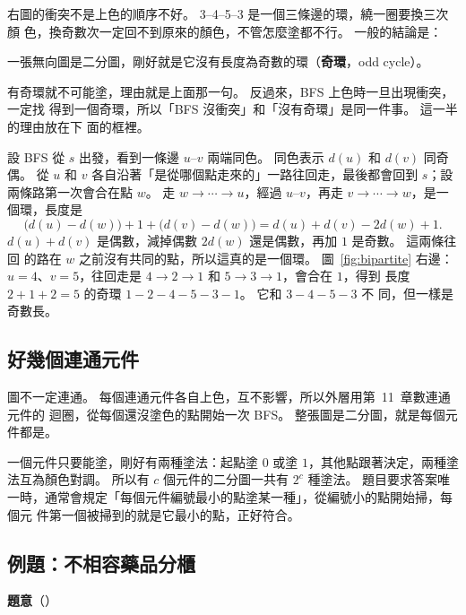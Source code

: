 右圖的衝突不是上色的順序不好。 3--4--5--3 是一個三條邊的環，繞一圈要換三次顏
色，換奇數次一定回不到原來的顏色，不管怎麼塗都不行。 一般的結論是：

\begin{center}
一張無向圖是二分圖，剛好就是它沒有長度為奇數的環（\textbf{奇環}，odd cycle）。
\end{center}

有奇環就不可能塗，理由就是上面那一句。 反過來，BFS 上色時一旦出現衝突，一定找
得到一個奇環，所以「BFS 沒衝突」和「沒有奇環」是同一件事。 這一半的理由放在下
面的框裡。

\begin{whybox}
設 BFS 從 $s$ 出發，看到一條邊 $u$--$v$ 兩端同色。 同色表示 $d(u)$ 和 $d(v)$
同奇偶。 從 $u$ 和 $v$ 各自沿著「是從哪個點走來的」一路往回走，最後都會回到
$s$；設兩條路第一次會合在點 $w$。 走 $w \to \cdots \to u$，經過 $u$--$v$，再走
$v \to \cdots \to w$，是一個環，長度是
\[
\bigl(d(u) - d(w)\bigr) + 1 + \bigl(d(v) - d(w)\bigr)
= d(u) + d(v) - 2d(w) + 1 .
\]
$d(u) + d(v)$ 是偶數，減掉偶數 $2d(w)$ 還是偶數，再加 $1$ 是奇數。 這兩條往回
的路在 $w$ 之前沒有共同的點，所以這真的是一個環。 圖~\ref{fig:bipartite} 右邊：
$u = 4$、$v = 5$，往回走是 $4 \to 2 \to 1$ 和 $5 \to 3 \to 1$，會合在 $1$，得到
長度 $2 + 1 + 2 = 5$ 的奇環 $1 - 2 - 4 - 5 - 3 - 1$。 它和 $3 - 4 - 5 - 3$ 不
同，但一樣是奇數長。
\end{whybox}

\subsection{好幾個連通元件}

圖不一定連通。 每個連通元件各自上色，互不影響，所以外層用第~11~章數連通元件的
迴圈，從每個還沒塗色的點開始一次 BFS。 整張圖是二分圖，就是每個元件都是。

一個元件只要能塗，剛好有兩種塗法：起點塗 $0$ 或塗 $1$，其他點跟著決定，兩種塗
法互為顏色對調。 所以有 $c$ 個元件的二分圖一共有 $2^c$ 種塗法。 題目要求答案唯
一時，通常會規定「每個元件編號最小的點塗某一種」，從編號小的點開始掃，每個元
件第一個被掃到的就是它最小的點，正好符合。

\subsection{例題：不相容藥品分櫃}
\label{sec:ex-cabinets}

\textbf{題意}（）

